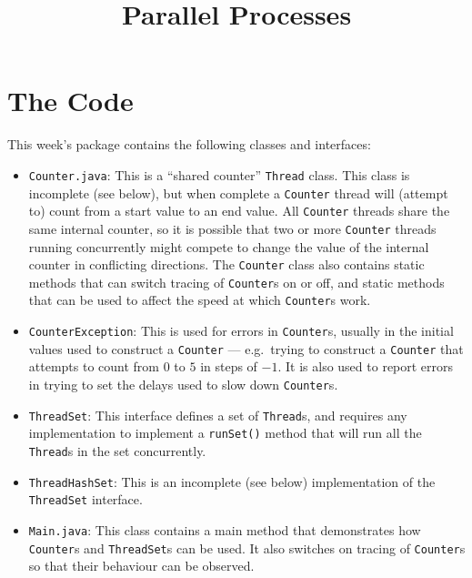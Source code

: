 \documentclass{article}
\title{Parallel Processes}
\begin{document}
\maketitle

\section{The Code}
This week's package contains the following classes and interfaces:
\begin{itemize}
\item {\tt Counter.java}: This
is a ``shared counter'' {\tt Thread} class.  This class is incomplete
(see below), but when complete a {\tt Counter} thread will (attempt to)
count from a start value to an end value.  All {\tt Counter} threads
share the same internal counter, so it is possible that two or more 
{\tt Counter} threads running concurrently might compete to change
the value of the internal counter in conflicting directions.
The {\tt Counter} class also contains static methods that can switch tracing
of {\tt Counter}s on or off, and static methods that can be used to
affect the speed at which {\tt Counter}s work.
\item {\tt CounterException}: This is used for errors in {\tt Counter}s,
usually in the initial values used to construct a {\tt Counter}
--- e.g.\ trying to construct a {\tt Counter} that attempts to count from
$0$ to $5$ in steps of $-1$.  It is also used to report errors in trying
to set the delays used to slow down {\tt Counter}s.
\item {\tt ThreadSet}: This interface defines a set of {\tt Thread}s, and
requires any implementation to implement a {\tt runSet()} method that will
run all the {\tt Thread}s in the set concurrently.
\item {\tt ThreadHashSet}: This is an incomplete (see below) 
implementation of the {\tt ThreadSet} interface.
\item {\tt Main.java}: This class contains a main method that demonstrates 
how {\tt Counter}s and {\tt ThreadSet}s can be used.  It also switches on
tracing of {\tt Counter}s so that their behaviour can be observed.
\end{itemize}
\end{document}
